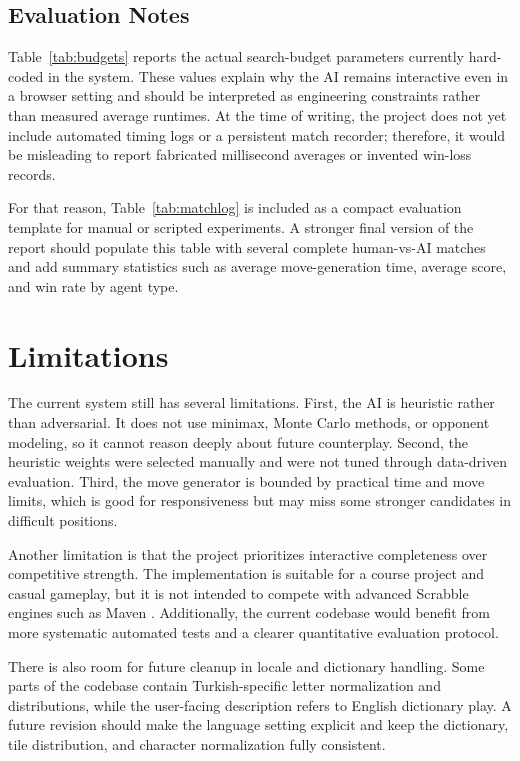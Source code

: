\documentclass[conference]{IEEEtran}
\begin{document}
\subsection{Evaluation Notes}
Table~\ref{tab:budgets} reports the actual search-budget parameters currently hard-coded in the system. These values explain why the AI remains interactive even in a browser setting and should be interpreted as engineering constraints rather than measured average runtimes. At the time of writing, the project does not yet include automated timing logs or a persistent match recorder; therefore, it would be misleading to report fabricated millisecond averages or invented win-loss records.

For that reason, Table~\ref{tab:matchlog} is included as a compact evaluation template for manual or scripted experiments. A stronger final version of the report should populate this table with several complete human-vs-AI matches and add summary statistics such as average move-generation time, average score, and win rate by agent type.

\section{Limitations}
The current system still has several limitations. First, the AI is heuristic rather than adversarial. It does not use minimax, Monte Carlo methods, or opponent modeling, so it cannot reason deeply about future counterplay. Second, the heuristic weights were selected manually and were not tuned through data-driven evaluation. Third, the move generator is bounded by practical time and move limits, which is good for responsiveness but may miss some stronger candidates in difficult positions.

Another limitation is that the project prioritizes interactive completeness over competitive strength. The implementation is suitable for a course project and casual gameplay, but it is not intended to compete with advanced Scrabble engines such as Maven \cite{sheppard2002world}. Additionally, the current codebase would benefit from more systematic automated tests and a clearer quantitative evaluation protocol.

There is also room for future cleanup in locale and dictionary handling. Some parts of the codebase contain Turkish-specific letter normalization and distributions, while the user-facing description refers to English dictionary play. A future revision should make the language setting explicit and keep the dictionary, tile distribution, and character normalization fully consistent.
\end{document}
